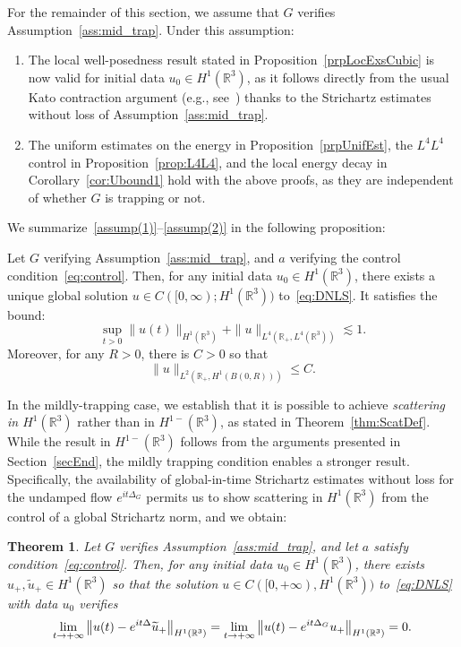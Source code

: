 \documentclass[10pt]{amsart}
\newtheorem{theo}{Theorem}[section]
\theoremstyle{definition}\newtheorem{defi}[theo]{Definition}\newtheorem{rema}[theo]{Remark}\newtheorem{exam}[theo]{Example}\newtheorem{exem}[theo]{Example}\newtheorem{nota}[theo]{Notation}
\newcommand*\R{\mathbb{R}}
\renewcommand*{\to}{\mathchoice{\longrightarrow}{\rightarrow}{\rightarrow}{\rightarrow}}
\begin{document}
For the remainder of this section, we assume that $G$ verifies Assumption~\ref{ass:mid_trap}. Under this assumption:
\begin{enumerate}
\item\label{assump(1)} The {local well-posedness result} stated in Proposition~\ref{prpLocExsCubic} is now valid for initial data $u_0 \in H^1(\R^3) $, as it follows directly from the usual Kato contraction argument (e.g., see~\cite{Ca03}) thanks to the Strichartz estimates without loss of Assumption~\ref{ass:mid_trap}.

\item\label{assump(2)} The uniform estimates on the energy in Proposition~\ref{prpUnifEst}, the $L^4L^4$ control in Proposition~\ref{prop:L4L4}, and the local energy decay in Corollary~\ref{cor:Ubound1} hold with the above proofs, as they are independent of whether $G$ is trapping or not.
\end{enumerate}
We summarize~\eqref{assump(1)}--\eqref{assump(2)} in the following proposition:
\begin{prop}
Let $G$ verifying Assumption~\ref{ass:mid_trap}, and $a$ verifying the control condition~\eqref{eq:control}. Then, for any initial data $u_0 \in H^1(\R^3) $, there exists a unique global solution $u \in C([0, \infty); H^1(\R^3)) $ to~\eqref{eq:DNLS}. It satisfies the bound:
\begin{equation}\label{eqH1L4Cont}
\sup_{t > 0} \| u(t) \|_{H^1(\R^3)} + \| u \|_{L^4\left(\R_+, L^4(\R^3)\right)} \lesssim 1.
\end{equation}
Moreover, for any $R>0$, there is $C>0$ so that
\begin{equation*}
\| u \|_{L^2\left(\R_+, H^1(B(0,R))\right)} \leq C.
\end{equation*}
\end{prop}

In the mildly-trapping case, we establish that it is possible to achieve \emph{scattering in $H^1(\R^3) $} rather than in $H^{1-}(\R^3) $, as stated in Theorem~\ref{thm:ScatDef}. While the result in $H^{1-}(\R^3) $ follows from the arguments presented in Section~\ref{secEnd}, the mildly trapping condition enables a stronger result. Specifically, the availability of global-in-time Strichartz estimates without loss for the undamped flow $e^{it\Delta_G}$ permits us to show scattering in $H^1(\R ^3)$ from the control of a global Strichartz norm, and we obtain:

\begin{theo} \label{th:mid_trapp}
Let $G$ verifies Assumption~\ref{ass:mid_trap}, and let $a$ satisfy condition~\eqref{eq:control}. Then, for any initial data $u_0 \in H^1(\R^3) $, there exists $u_+, \widetilde u_+ \in H^1(\R^3)$ so that the solution $u \in C([0, +\infty), H^1(\R ^3))$ to~\eqref{eq:DNLS} with data $u_0$ verifies
\[
\lim_{t \to +\infty}\left\| u(t) - e^{it\Delta} \widetilde u_+ \right\|_{H^1(\R ^3)} =
\lim_{t \to +\infty}\left\| u(t) - e^{it\Delta_G} u_+ \right\|_{H^1(\R ^3)} = 0.
\]
\end{theo}
\end{document}
